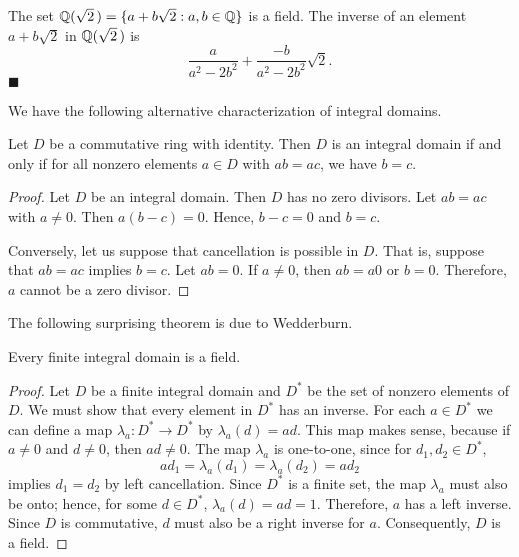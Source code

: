  
\vspace{2ex}
 
 
The set ${\Bbb Q}( \sqrt{2}\, ) = \{ a + b \sqrt{2} : a, b \in {\Bbb Q}
\}$ is a field. The inverse of an element $a + b \sqrt{2}$ in ${\Bbb
Q}( \sqrt{2}\, )$ is  
\[
\frac{a}{a^2 - 2 b^2} +\frac{- b}{ a^2 - 2 b^2} \sqrt{2}.
\]
\hspace{\fill} $\blacksquare$
 
 
\vspace{2ex}
 
 
We have the following alternative characterization of integral
domains. 
 
 

 
 
\begin{proposition}
Let $D$ be a commutative ring with identity. Then $D$ is an integral
domain if and only if for all nonzero elements $a \in D$ with $ab =
ac$, we have $b=c$. 
\end{proposition}
 
 
\begin{proof}
Let $D$ be an integral domain. Then $D$ has no zero divisors.  Let $ab
= ac$ with $a \neq 0$. Then $a(b - c) =0$.  Hence, $b - c = 0$ and $b
= c$. 
 
 
Conversely, let us suppose that cancellation is possible in $D$.
That is, suppose that $ab = ac$ implies $b=c$. Let $ab = 0$.  If $a
\neq 0$, then $ab = a 0$ or $b=0$.  Therefore, $a$ cannot be a zero
divisor. 
\end{proof}
 
 
\vspace{2ex}
 
 
The following surprising theorem is due to Wedderburn.
 
 
\begin{theorem}
Every finite integral domain is a field.
\end{theorem}
 
 
\begin{proof}
Let $D$ be a finite integral domain and $D^\ast$ be the set of nonzero
elements of $D$.  We must show that every element in $D^*$ has an
inverse. For each $a \in D^\ast$ we can define a map $\lambda_a :
D^\ast \rightarrow D^\ast$ by $\lambda_a(d) = ad$.  This map makes
sense, because if  $a \neq 0$ and $d \neq 0$, then $ad \neq 0$.  The map
$\lambda_a$ is one-to-one, since for $d_1, d_2 \in D^*$, 
\[
ad_1 = \lambda_a(d_1) = \lambda_a(d_2) = ad_2
\]
implies $d_1 = d_2$ by left cancellation. Since $D^\ast$ is a finite
set, the map $\lambda_a$ must also be onto; hence, for some $d \in
D^\ast$, $\lambda_a(d) = ad = 1$. Therefore, $a$ has a left inverse.
Since $D$ is commutative, $d$ must also be a right inverse for $a$.
Consequently, $D$ is a field. 
\end{proof}
 
